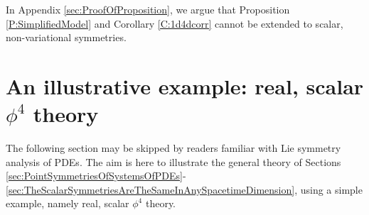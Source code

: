 \documentclass[a4paper,hidelinks, 12pt]{article}
\numberwithin{equation}{section}
\theoremstyle{plain}
\begin{document}
In Appendix \ref{sec:ProofOfProposition}, we argue that Proposition \ref{P:SimplifiedModel} and Corollary \ref{C:1d4dcorr} cannot be extended to scalar, non-variational symmetries.


\section{An illustrative example: real, scalar $\phi^4$ theory}
\label{sec:ASimpleExamplePhi4Theory}
The following section may be skipped by readers familiar
with Lie symmetry analysis of PDEs. The aim is here to illustrate the general theory of Sections \ref{sec:PointSymmetriesOfSystemsOfPDEs}-\ref{sec:TheScalarSymmetriesAreTheSameInAnySpacetimeDimension}, using a simple example, namely
 real, scalar $\phi^4$ theory.
\end{document}
